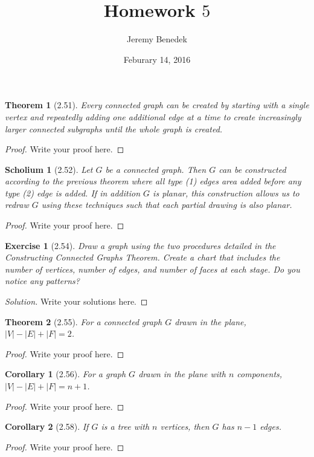 \documentclass{article}
\title{Homework $5$}
\author{Jeremy Benedek}
\date{Feburary 14, 2016}
\newtheorem*{thm}{Theorem}
\newtheorem*{ex}{Exercise}
\newtheorem*{cor}{Corollary}
\newtheorem{sch}{Scholium}
\newenvironment{solution}
  {\begin{proof}[Solution]}
  {\renewcommand{\qedsymbol}{}\end{proof}}
\begin{document}
\maketitle

\begin{thm}[2.51]
	Every connected graph can be created by starting with a single vertex and repeatedly adding one additional edge at a time to create increasingly larger connected subgraphs until the whole graph is created.
\end{thm}
\begin{proof}
    Write your proof here.
\end{proof}

\begin{sch}[2.52]
	Let $G$ be a connected graph. Then $G$ can be constructed according to the previous theorem where all type (1) edges area added before any type (2) edge is added. If in addition $G$ is planar, this construction allows
	us to redraw $G$ using these techniques such that each partial drawing is also planar.
\end{sch}
\begin{proof}
    Write your proof here.
\end{proof}

\begin{ex}[2.54]
	Draw a graph using the two procedures detailed in the Constructing Connected Graphs Theorem. Create a chart that includes the number of vertices, number of edges, and number of faces at each stage. Do you notice any patterns?
\end{ex}
\begin{solution}
    Write your solutions here.
\end{solution}

\begin{thm}[2.55]
	For a connected graph $G$ drawn in the plane, $|V| - |E| + |F| = 2$.
\end{thm}
\begin{proof}
    Write your proof here.
\end{proof}

\begin{cor}[2.56]
	For a graph $G$ drawn in the plane with $n$ components, $|V| - |E| + |F| = n + 1$.
\end{cor}
\begin{proof}
    Write your proof here.
\end{proof}

\begin{cor}[2.58]
	If $G$ is a tree with $n$ vertices, then $G$ has $n - 1$ edges.
\end{cor}
\begin{proof}
    Write your proof here.
\end{proof}
\end{document}
